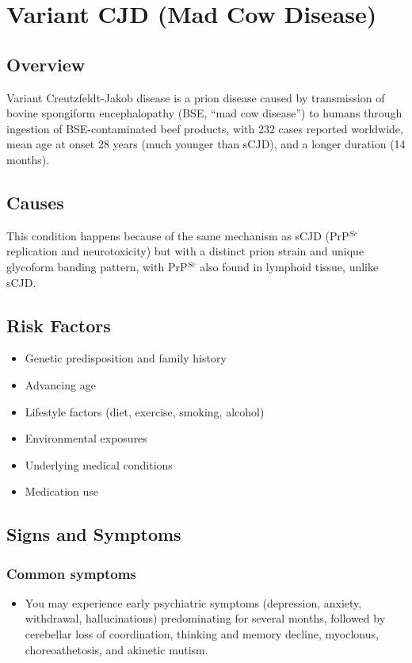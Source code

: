\chapter{Variant CJD (Mad Cow Disease)}
\label{sec:Variant CJD}

\section{Overview}
Variant Creutzfeldt-Jakob disease is a prion disease caused by transmission of bovine spongiform encephalopathy (BSE, ``mad cow disease'') to humans through ingestion of BSE-contaminated beef products, with 232 cases reported worldwide, mean age at onset 28 years (much younger than sCJD), and a longer duration (14 months).
\section{Causes}
This condition happens because of the same mechanism as sCJD (PrP$^{Sc}$ replication and neurotoxicity) but with a distinct prion strain and unique glycoform banding pattern, with PrP$^{Sc}$ also found in lymphoid tissue, unlike sCJD.     
\section{Risk Factors}

\begin{itemize}[noitemsep]
  \item Genetic predisposition and family history
  \item Advancing age
  \item Lifestyle factors (diet, exercise, smoking, alcohol)
  \item Environmental exposures
  \item Underlying medical conditions
  \item Medication use
\end{itemize}
\section{Signs and Symptoms}

\subsection{Common symptoms}
\begin{itemize}[noitemsep]
  \item You may experience early psychiatric symptoms (depression, anxiety, withdrawal, hallucinations) predominating for several months, followed by cerebellar loss of coordination, thinking and memory decline, myoclonus, choreoathetosis, and akinetic mutism. 
  \end{itemize}

